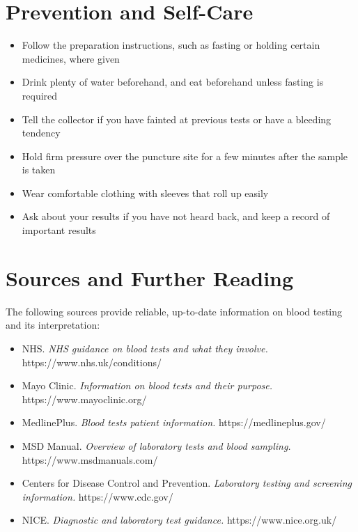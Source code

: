 \section*{Prevention and Self-Care}
\begin{itemize}
    \item Follow the preparation instructions, such as fasting or holding certain medicines, where given
    \item Drink plenty of water beforehand, and eat beforehand unless fasting is required
    \item Tell the collector if you have fainted at previous tests or have a bleeding tendency
    \item Hold firm pressure over the puncture site for a few minutes after the sample is taken
    \item Wear comfortable clothing with sleeves that roll up easily
    \item Ask about your results if you have not heard back, and keep a record of important results
\end{itemize}

\section*{Sources and Further Reading}
The following sources provide reliable, up-to-date information on blood testing and its interpretation:

\begin{itemize}
    \item NHS. \textit{NHS guidance on blood tests and what they involve.} https://www.nhs.uk/conditions/
    \item Mayo Clinic. \textit{Information on blood tests and their purpose.} https://www.mayoclinic.org/
    \item MedlinePlus. \textit{Blood tests patient information.} https://medlineplus.gov/
    \item MSD Manual. \textit{Overview of laboratory tests and blood sampling.} https://www.msdmanuals.com/
    \item Centers for Disease Control and Prevention. \textit{Laboratory testing and screening information.} https://www.cdc.gov/
    \item NICE. \textit{Diagnostic and laboratory test guidance.} https://www.nice.org.uk/
\end{itemize}
